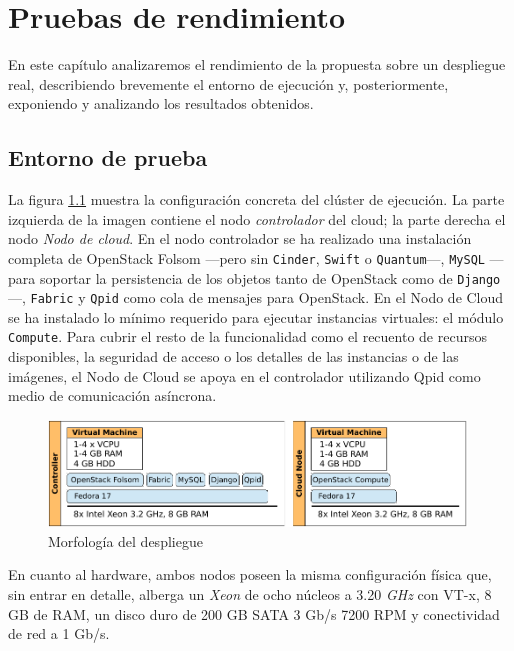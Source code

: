 \chapter{Pruebas de rendimiento}\label{cap:rendimiento}
\noindent En este cap\'itulo analizaremos el rendimiento de la propuesta sobre un des\-plie\-gue real, describiendo brevemente el entorno de ejecuci\'on y, posteriormente, exponiendo y ana\-li\-zan\-do los resultados obtenidos.

\section{Entorno de prueba}\label{sec:entornodeprueba}
\noindent La figura \ref{fig:clusterdespliegue} muestra la configuraci\'on concreta del cl\'uster de ejecuci\'on. La parte izquierda de la imagen contiene el nodo \emph{controlador} del cloud; la parte derecha el nodo \emph{Nodo de cloud}. En el nodo controlador se ha realizado una instalaci\'on completa de OpenStack Folsom ---pero sin \texttt{Cinder}, \texttt{Swift} o \texttt{Quantum}---, \texttt{MySQL} ---para soportar la persistencia de los objetos tanto de OpenStack como de \texttt{Django}---, \texttt{Fabric} y \texttt{Qpid} como cola de mensajes para OpenStack. En el Nodo de Cloud se ha instalado lo m\'inimo requerido para ejecutar instancias virtuales: el m\'odulo \texttt{Compute}. Para cubrir el resto de la funcionalidad como el recuento de recursos disponibles, la seguridad de acceso o los detalles de las instancias o de las im\'agenes, el Nodo de Cloud se apoya en el controlador utilizando Qpid como medio de comunicaci\'on as\'incrona.\newline

\begin{figure}[tbp]
\begin{center}
\includegraphics[width=0.99\textwidth]{imagenes/038.pdf}
 \caption{Morfolog\'ia del despliegue}
\label{fig:clusterdespliegue}
\end{center}
\end{figure}

En cuanto al hardware, ambos nodos poseen la misma configuraci\'on f\'isica que, sin entrar en detalle, alberga un \emph{Xeon} de ocho n\'ucleos a 3.20 \emph{GHz} con VT-x, 8 GB de RAM, un disco duro de 200 GB SATA 3 Gb/s 7200 RPM y conectividad de red a 1 Gb/s.

